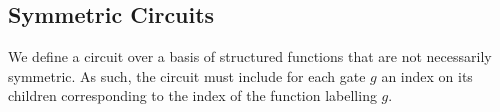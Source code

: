 \documentclass[../paper.tex]{subfiles}
\begin{document}


\subsection{Symmetric Circuits}
We define a circuit over a basis of structured functions that are not
necessarily symmetric. As such, the circuit must include for each gate $g$ an
index on its children corresponding to the index of the function labelling $g$.


\end{document}
